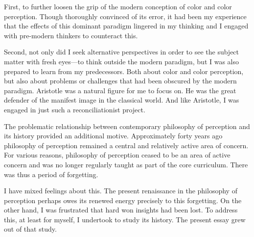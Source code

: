 First, to further loosen the grip of the modern conception of color and color perception. Though thoroughly convinced of its error, it had been my experience that the effects of this dominant paradigm lingered in my thinking and I engaged with pre-modern thinkers to counteract this. 

Second, not only did I seek alternative perspectives in order to see the subject matter with fresh eyes---to think outside the modern paradigm, but I was also prepared to learn from my predecessors. Both about color and color perception, but also about problems or challenges that had been obscured by the modern paradigm. Aristotle was a natural figure for me to focus on. He was the great defender of the manifest image in the classical world. And like Aristotle, I was engaged in just such a reconciliationist project.

The problematic relationship between contemporary philosophy of perception and its history provided an additional motive. Approximately forty years ago philosophy of perception remained a central and relatively active area of concern. For various reasons, philosophy of perception ceased to be an area of active concern and was no longer regularly taught as part of the core curriculum. There was thus a period of forgetting. 

I have mixed feelings about this. The present renaissance in the philosophy of perception perhaps owes its renewed energy precisely to this forgetting. On the other hand, I was frustrated that hard won insights had been lost. To address this, at least for myself, I undertook to study its history. The present essay grew out of that study.


